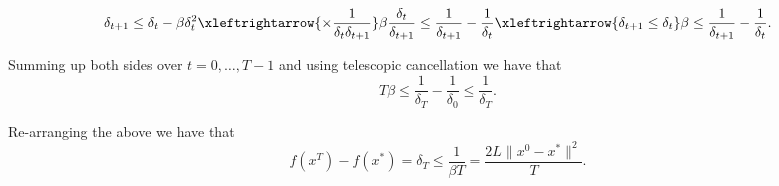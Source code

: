 \documentclass{article}
\begin{document}
\[
\delta_{t+1} \leq \delta_t - \beta \delta_t^2 \xleftrightarrow{\times \frac{1}{\delta_t \delta_{t+1}}}
\beta \frac{\delta_t}{\delta_{t+1}} \leq \frac{1}{\delta_{t+1}} - \frac{1}{\delta_t}
\xleftrightarrow{\delta_{t+1} \leq \delta_t}
\beta \leq \frac{1}{\delta_{t+1}} - \frac{1}{\delta_t}.
\]

Summing up both sides over $t = 0, \dots, T - 1$ and using telescopic cancellation we have that
\[
T \beta \leq \frac{1}{\delta_T} - \frac{1}{\delta_0} \leq \frac{1}{\delta_T}.
\]

Re-arranging the above we have that
\[
f(x^T) - f(x^*) = \delta_T \leq \frac{1}{\beta T} = \frac{2L \|x^0 - x^*\|^2}{T}.
\]







\end{document}
